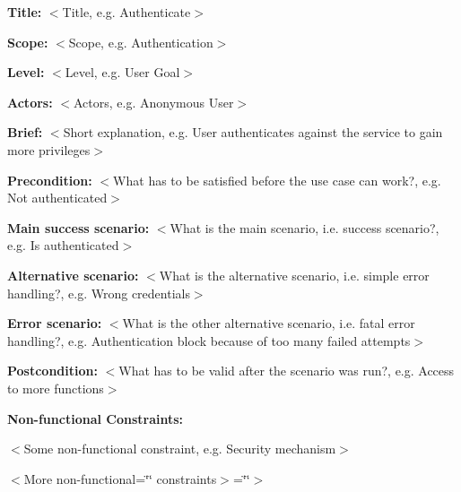 
\begin{DoxyItemize}
\item {\bfseries Title\+:} $<$Title, e.\+g. Authenticate$>$
\item {\bfseries Scope\+:} $<$Scope, e.\+g. Authentication$>$
\item {\bfseries Level\+:} $<$Level, e.\+g. User Goal$>$
\item {\bfseries Actors\+:} $<$Actors, e.\+g. Anonymous User$>$
\item {\bfseries Brief\+:} $<$Short explanation, e.\+g. User authenticates against the service to gain more privileges$>$
\end{DoxyItemize}


\begin{DoxyItemize}
\item {\bfseries Precondition\+:} $<$What has to be satisfied before the use case can work?, e.\+g. Not authenticated$>$
\item {\bfseries Main success scenario\+:} $<$What is the main scenario, i.\+e. success scenario?, e.\+g. Is authenticated$>$
\item {\bfseries Alternative scenario\+:} $<$What is the alternative scenario, i.\+e. simple error handling?, e.\+g. Wrong credentials$>$
\item {\bfseries Error scenario\+:} $<$What is the other alternative scenario, i.\+e. fatal error handling?, e.\+g. Authentication block because of too many failed attempts$>$
\item {\bfseries Postcondition\+:} $<$What has to be valid after the scenario was run?, e.\+g. Access to more functions$>$
\item {\bfseries Non-\/functional Constraints\+:}
\begin{DoxyItemize}
\item $<$Some non-\/functional constraint, e.\+g. Security mechanism$>$
\item $<$\+More non-\/functional=\char`\"{}\char`\"{} constraints$>$=\char`\"{}\char`\"{}$>$ 
\end{DoxyItemize}
\end{DoxyItemize}